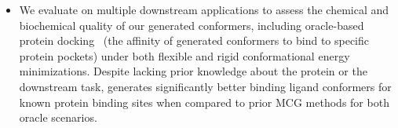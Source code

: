 \begin{itemize}
\item We evaluate \model on multiple downstream applications to assess the chemical and biochemical quality of our generated conformers, including oracle-based protein docking~\citep{tdc} (the affinity of generated conformers to bind to specific protein pockets) under both flexible and rigid conformational energy minimizations. Despite lacking prior knowledge about the protein or the downstream task, \model generates significantly better binding ligand conformers for known protein binding sites when compared to prior MCG methods for both oracle scenarios.




\end{itemize}
